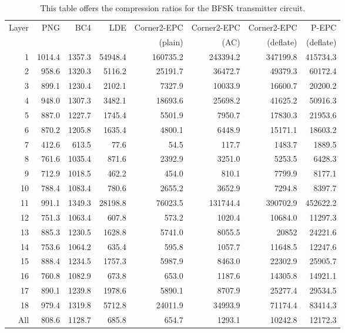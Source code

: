 \documentclass{article}
\begin{document}
\begin{table}
\caption{This table offers the compression ratios for the BFSK 
transmitter circuit.}
\label{table:compression-chipframe}
\begin{center}
\begin{tabular}{r r r r r r r r}
\hline
\hline
Layer & PNG & BC4 & LDE & Corner2-EPC & Corner2-EPC & Corner2-EPC & P-EPC \tabularnewline
\mbox{} & \mbox{} & \mbox{} & \mbox{} & (plain) & (AC) & (deflate)
& (deflate) \tabularnewline
\hline
1 & 1014.4 & 1357.3 & 54948.4 & 160735.2 & 243394.2 & 347199.8 & 415734.3
\tabularnewline
2 & 958.6 & 1320.3 & 5116.2 & 25191.7 & 36472.7 & 49379.3 & 60172.4
\tabularnewline
3 & 899.1 & 1230.4 & 2102.1 & 7327.9 & 10033.9 & 16600.7 & 20200.2
\tabularnewline
4 & 948.0 & 1307.3 & 3482.1 & 18693.6 & 25698.2 & 41625.2 & 50916.3
\tabularnewline
5 & 887.0 & 1227.7 & 1745.4 & 5501.9 & 7950.7 & 17830.3 & 21953.6
\tabularnewline
6 & 870.2 & 1205.8 & 1635.4 & 4800.1 & 6448.9 & 15171.1 & 18603.2
\tabularnewline
7 & 412.6 & 613.5 & 77.6 & 54.5 & 117.7 & 1483.7 & 1889.5
\tabularnewline
8 & 761.6 & 1035.4 & 871.6 & 2392.9 & 3251.0 & 5253.5 & 6428.3
\tabularnewline
9 & 712.9 & 1018.5 & 462.2 & 454.0 & 810.1 & 7799.9 & 8177.1
\tabularnewline
10 & 788.4 & 1083.4 & 780.6 & 2655.2 & 3652.9 & 7294.8 & 8397.7
\tabularnewline
11 & 991.1 & 1349.3 & 28198.8 & 76023.5 & 131744.4 & 390702.9 & 452622.2
\tabularnewline
12 & 751.3 & 1063.4 & 607.8 & 573.2 & 1020.4 & 10684.0 & 11297.3
\tabularnewline
13 & 885.3 & 1230.5 & 1628.8 & 5741.0 & 8055.5 & 20852 & 24221.6
\tabularnewline
14 & 753.6 & 1064.2 & 635.4 & 595.8 & 1057.7 & 11648.5 & 12247.6
\tabularnewline
15 & 888.4 & 1234.5 & 1757.3 & 5987.9 & 8463.0 & 22302.9 & 25905.7
\tabularnewline
16 & 760.8 & 1082.9 & 673.8 & 653.0 & 1187.6 & 14305.8 & 14921.1
\tabularnewline
17 & 890.1 & 1239.8 & 1978.6 & 5890.1 & 8707.9 & 25277.4 & 29534.5
\tabularnewline
18 & 979.4 & 1319.8 & 5712.8 & 24011.9 & 34993.9 & 71174.4 & 83414.3
\tabularnewline
All & 808.6 & 1128.7 & 685.8 & 654.7 & 1293.1 & 10242.8 & 12172.3
\tabularnewline
\hline \hline
\end{tabular}
\par\end{center}
\end{table}

\bigskip
\end{document}

